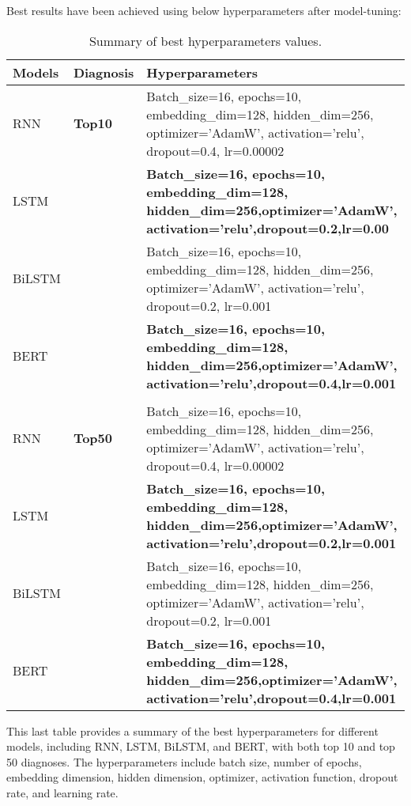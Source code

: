 \documentclass[journal,article,submit,pdftex,moreauthors]{Definitions/mdpi}
\begin{document}
Best results have been achieved using below hyperparameters after model-tuning:
\begin{table}[h]
\caption{Summary of best hyperparameters values.}
\label{tab1}
\centering
\begin{tabular}{llp{8cm}} %
\toprule
\textbf{Models} & \textbf{Diagnosis} & \textbf{Hyperparameters} \\ 
\midrule
RNN & \textbf{Top10} & Batch\_size=16, epochs=10, embedding\_dim=128, hidden\_dim=256, optimizer='AdamW', activation='relu', dropout=0.4, lr=0.00002 \\
LSTM &   & \textbf{Batch\_size=16, epochs=10, embedding\_dim=128, hidden\_dim=256,optimizer='AdamW', activation='relu',dropout=0.2,lr=0.00}  \\
BiLSTM &  & Batch\_size=16, epochs=10, embedding\_dim=128, hidden\_dim=256, optimizer='AdamW', activation='relu', dropout=0.2, lr=0.001  \\
BERT &  & \textbf{Batch\_size=16, epochs=10, embedding\_dim=128, hidden\_dim=256,optimizer='AdamW', activation='relu',dropout=0.4,lr=0.001}   \\ \\
RNN & \textbf{Top50} & Batch\_size=16, epochs=10, embedding\_dim=128, hidden\_dim=256, optimizer='AdamW', activation='relu', dropout=0.4, lr=0.00002  \\
LSTM &  & \textbf{Batch\_size=16, epochs=10, embedding\_dim=128, hidden\_dim=256,optimizer='AdamW', activation='relu',dropout=0.2,lr=0.001}  \\
BiLSTM &  & Batch\_size=16, epochs=10, embedding\_dim=128, hidden\_dim=256, optimizer='AdamW', activation='relu', dropout=0.2, lr=0.001  \\
BERT &  & \textbf{Batch\_size=16, epochs=10, embedding\_dim=128, hidden\_dim=256,optimizer='AdamW', activation='relu',dropout=0.4,lr=0.001}    \\
\bottomrule
\end{tabular}
\end{table}

This last table provides a summary of the best hyperparameters for different models, including RNN, LSTM, BiLSTM, and BERT, with both top 10 and top 50 diagnoses. The hyperparameters include batch size, number of epochs, embedding dimension, hidden dimension, optimizer, activation function, dropout rate, and learning rate.
\end{document}
